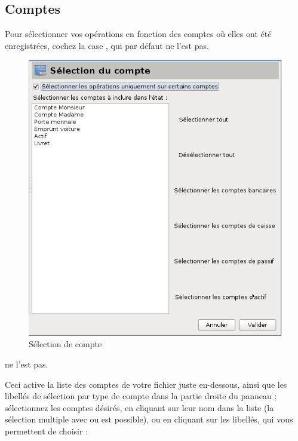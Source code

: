 \subsection{Comptes\label{reportscreation-selection-accounts}}

Pour sélectionner vos opérations en fonction des comptes où elles ont été enregistrées, cochez la case , qui par défaut \ifIllustration ne l'est pas.
\begin{figure}[htbp]
\begin{center}
\includegraphics[scale=0.5]{image/screenshot/reportcreation_datas_accounts}
\end{center}
\caption{Sélection de compte}
\label{reportcreation-datas-accounts-img}
\end{figure}
\else ne l'est pas.
\fi

Ceci active la liste des comptes de votre fichier juste en-dessous, ainsi que les libellés de sélection par type de compte dans la partie droite du panneau ; sélectionnez les comptes désirés, en cliquant sur leur nom dans la liste (la sélection multiple avec  ou   est possible), ou en cliquant sur les libellés, qui vous permettent de choisir :

